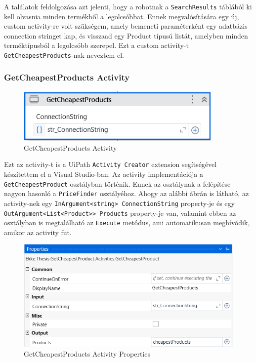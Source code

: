 \documentclass[
]{thesis-ekf}
\theoremstyle{definition}
\theoremstyle{remark}
\begin{document}
A találatok feldolgozása azt jelenti, hogy a robotnak a \texttt{SearchResults} táblából ki kell olvasnia minden termékből a legolcsóbbat. Ennek megvalósítására egy új, custom activity-re volt szükségem, amely bemeneti paraméterként egy adatbázis  connection stringet kap, és visszaad egy Product típusú listát, amelyben minden terméktípusból a legolcsóbb szerepel. Ezt a custom activity-t \texttt{GetCheapestProducts}-nak neveztem el.

\subsubsection*{GetCheapestProducts Activity}
\begin{figure}[!ht]
	\centering
	\includegraphics[width=10cm]{GetCheapestProducts}
	\caption{ GetCheapestProducts Activity}
	\label{picture-GetCheapestProducts}
\end{figure}

Ezt az activity-t is a UiPath \texttt{Activity Creator} extension segítségével készítettem el a Visual Studio-ban. Az activity implementációja a \texttt{GetCheapestProduct} osztályban történik. Ennek az osztálynak a felépítése nagyon hasonló a \texttt{PriceFinder} osztályéhoz. Ahogy az alábbi ábrán is látható, az activity-nek egy \texttt{InArgument<string> ConnectionString} property-je és egy \texttt{OutArgument<List<Product>}\texttt{> Products} property-je van, valamint ebben az osztályban is megtalálható az \texttt{Execute} metódus, ami automatikusan meghívódik, amikor az activity fut.

\begin{figure}[!ht]
	\centering
	\includegraphics[width=14cm]{property}
	\caption{ GetCheapestProducts Activity Properties}
	\label{picture-Property}
\end{figure}
\end{document}
